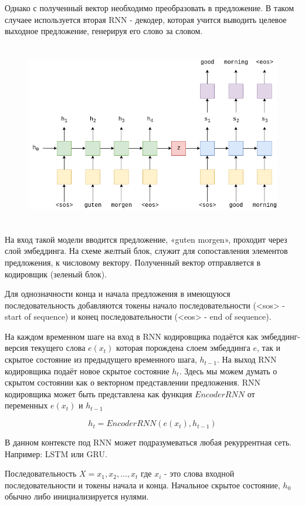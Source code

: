 	Однако с полученный вектор необходимо преобразовать в предложение. В таком случаее используется вторая RNN - декодер, которая учится выводить целевое выходное предложение, генерируя его слово за словом.
	
	\begin{figure}[ht!]
		\centering
		\captionsetup{justification=centering}
		\includegraphics[height=80mm]{img/encoder-decoder-img-1.png}
	\end{figure}
	
	На вход такой модели вводится предложение, «guten morgen», проходит через слой эмбеддинга. На схеме желтый блок, служит для сопоставления элементов предложения, к числовому вектору. Полученный вектор отправляется в кодировщик (зеленый блок).
	
	Для однозначности конца и начала предложения в имеющуюся последовательность добавляются токены начало последовательности (<sos> - start of sequence) и конец последовательности (<eos> - end of sequence). 
	
	На каждом временном шаге на вход в RNN кодировщика подаётся как эмбеддинг-версия текущего слова $e(x_t)$ которая порождена слоем эмбеддинга $e$, так и скрытое состояние из предыдущего временного шага, $h_{t-1}$. На выход RNN кодировщика подаёт новое скрытое состояние $h_t$. Здесь мы можем думать о скрытом состоянии как о векторном представлении предложения. RNN кодировщика может быть представлена как функция $EncoderRNN$ от переменных $e(x_t)$ и $h_{t-1}$
	
	$$
	    h_t = EncoderRNN(e(x_t), h_{t-1})
	$$
	
	В данном контексте под RNN может подразумеваться любая рекуррентная сеть. Например: LSTM или GRU.
	
	Последовательность $X = {x_1, x_2, ..., x_t}$ где $x_i$ - это слова входной последовательности и токены начала и конца. Начальное скрытое состояние, $h_0$ обычно либо инициализируется нулями.

